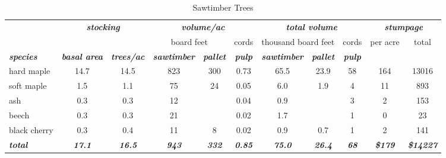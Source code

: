 \documentclass[landscape]{article}
\begin{document}
\begin{table}[H]

\caption{\label{tab:unnamed-chunk-12}Sawtimber Trees}
\fontsize{10}{12}\selectfont
\begin{tabular}[t]{lcccccccccc}
\toprule
\multicolumn{1}{c}{\em{\textbf{ }}} & \multicolumn{2}{c}{\em{\textbf{stocking}}} & \multicolumn{3}{c}{\em{\textbf{volume/ac }}} & \multicolumn{3}{c}{\em{\textbf{total volume}}} & \multicolumn{2}{c}{\em{\textbf{stumpage}}} \\
\cmidrule(l{3pt}r{3pt}){2-3} \cmidrule(l{3pt}r{3pt}){4-6} \cmidrule(l{3pt}r{3pt}){7-9} \cmidrule(l{3pt}r{3pt}){10-11}
\multicolumn{3}{c}{ } & \multicolumn{2}{c}{board feet} & \multicolumn{1}{c}{cords} & \multicolumn{2}{c}{thousand board feet} & \multicolumn{1}{c}{cords} & \multicolumn{1}{c}{per acre} & \multicolumn{1}{c}{total} \\
\cmidrule(l{3pt}r{3pt}){4-5} \cmidrule(l{3pt}r{3pt}){6-6} \cmidrule(l{3pt}r{3pt}){7-8} \cmidrule(l{3pt}r{3pt}){9-9} \cmidrule(l{3pt}r{3pt}){10-10} \cmidrule(l{3pt}r{3pt}){11-11}
\rowcolor[HTML]{DCDCDC}  \em{\textbf{species}} & \em{\textbf{basal area}} & \em{\textbf{trees/ac}} & \em{\textbf{sawtimber}} & \em{\textbf{pallet}} & \em{\textbf{pulp}} & \em{\textbf{sawtimber}} & \em{\textbf{pallet}} & \em{\textbf{pulp}} & \em{\textbf{ }} & \em{\textbf{ }}\\
\midrule
\rowcolor{gray!6}  hard maple & 14.7 & 14.5 & 823 & 300 & 0.73 & 65.5 & 23.9 & 58 & 164 & 13016\\
 
soft maple & 1.5 & 1.1 & 75 & 24 & 0.05 & 6.0 & 1.9 & 4 & 11 & 893\\
 
\rowcolor{gray!6}  ash & 0.3 & 0.3 & 12 &  & 0.04 & 0.9 &  & 3 & 2 & 153\\
 
beech & 0.3 & 0.3 & 21 &  & 0.02 & 1.7 &  & 1 & 0 & 23\\
 
\rowcolor{gray!6}  black cherry & 0.3 & 0.4 & 11 & 8 & 0.02 & 0.9 & 0.7 & 1 & 2 & 141\\
 
\rowcolor[HTML]{DCDCDC}  \em{\textbf{total}} & \em{\textbf{17.1}} & \em{\textbf{16.5}} & \em{\textbf{943}} & \em{\textbf{332}} & \em{\textbf{0.85}} & \em{\textbf{75.0}} & \em{\textbf{26.4}} & \em{\textbf{68}} & \em{\textbf{\$179}} & \em{\textbf{\$14227}}\\
\bottomrule
\end{tabular}
\end{table}
\end{document}
